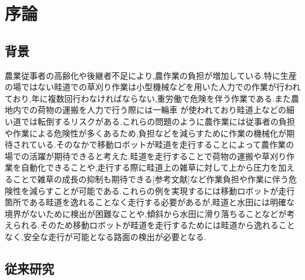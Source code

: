 \chapter{序論}
\section{背景}
農業従事者の高齢化や後継者不足により,農作業の負担が増加している.特に生産の場ではない畦道での草刈り作業は小型機械などを用いた人力での作業が行われており,年に複数回行わなければならない,重労働で危険を伴う作業である.また農地内での荷物の運搬を人力で行う際には一輪車%
が使われており畦道上などの細い道では転倒するリスクがある.これらの問題のように農作業には従事者の負担や作業による危険性が多くあるため,負担などを減らすために作業の機械化が期待されている.そのなかで移動ロボットが畦道を走行することによって農作業の場での活躍が期待できると考えた.畦道を走行することで荷物の運搬や草刈り作業を自動化できることや,走行する際に畦道上の雑草に対して上から圧力を加えることで雑草の成長の抑制も期待できる[参考文献]など作業負担や作業に伴う危険性を減らすことが可能である.これらの例を実現するには移動ロボットが走行箇所である畦道を逸れることなく走行する必要があるが,畦道と水田には明確な境界がないために検出が困難なことや,傾斜から水田に滑り落ちることなどが考えられる.そのため移動ロボットが畦道を走行するためには畦道から逸れることなく,安全な走行が可能となる路面の検出が必要となる.
\section{従来研究}


%
